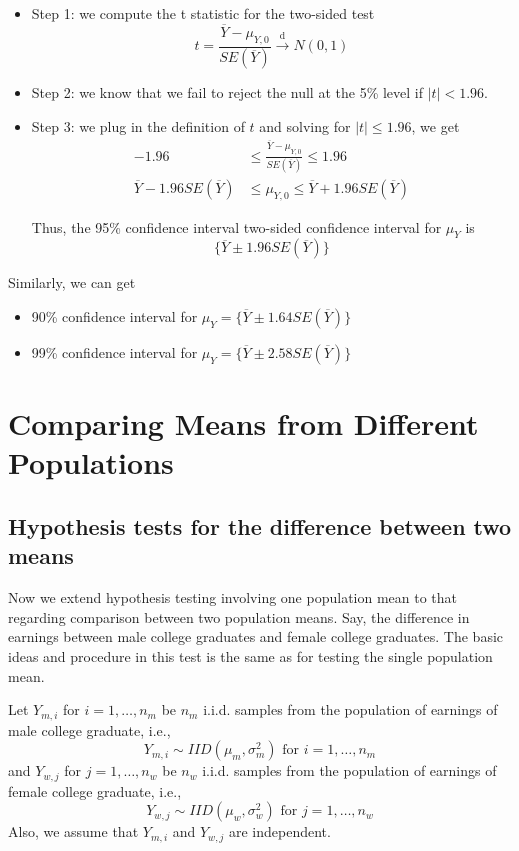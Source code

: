 \documentclass[a4paper,11pt]{article}
\begin{document}
\begin{itemize}
\item Step 1: we compute the t statistic for the two-sided test
\[ t = \frac{\overline{Y} - \mu_{Y,0}}{SE(\overline{Y})}
   \xrightarrow{\text{ d }} N(0, 1) \]

\item Step 2: we know that we fail to reject the null at the 5\% level if \(|t| <
  1.96\).

\item Step 3: we plug in the definition of \(t\) and solving for \(|t| \leq 1.96\), we
get
\begin{align*}
-1.96 & \leq \frac{\overline{Y} - \mu_{Y,0}}{SE(\overline{Y})} \leq 1.96 \\
\overline{Y} - 1.96 SE(\overline{Y}) & \leq \mu_{Y,0} \leq \overline{Y} + 1.96 SE(\overline{Y})
\end{align*}

Thus, the 95\% confidence interval two-sided confidence interval for
\(\mu_Y\) is 
\[ \{ \overline{Y} \pm 1.96 SE(\overline{Y}) \} \]
\end{itemize}

Similarly, we can get 
\begin{itemize}
\item 90\% confidence interval for \(\mu_Y = \{ \overline{Y} \pm 1.64
  SE(\overline{Y}) \}\)
\item 99\% confidence interval for \(\mu_Y = \{ \overline{Y} \pm 2.58
  SE(\overline{Y}) \}\)
\end{itemize}


\section{Comparing Means from Different Populations}
\label{sec:org7a34210}

\subsection{Hypothesis tests for the difference between two means}
\label{sec:orgd6c6e9d}

Now we extend hypothesis testing involving one population mean to that
regarding comparison between two population means. Say, the difference
in earnings between male college graduates and female college
graduates. The basic ideas and procedure in this test is the same as
for testing the single population mean. 

Let \(Y_{m, i}\) for \(i=1, \ldots, n_m\) be \(n_m\) i.i.d. samples from the
population of earnings of male college graduate, i.e., 
\[ Y_{m,i} \sim IID(\mu_m, \sigma^2_m)  \text{ for } i=1,\ldots,n_m \]
and \(Y_{w, j}\) for
\(j=1, \ldots, n_w\) be \(n_w\) i.i.d. samples from the population of
earnings of female college graduate, i.e.,
\[ Y_{w,j} \sim IID(\mu_w, \sigma^2_w)  \text{ for } j=1,\ldots,n_w \]
Also, we assume that \(Y_{m,i}\) and \(Y_{w,j}\) are independent. 
\end{document}
